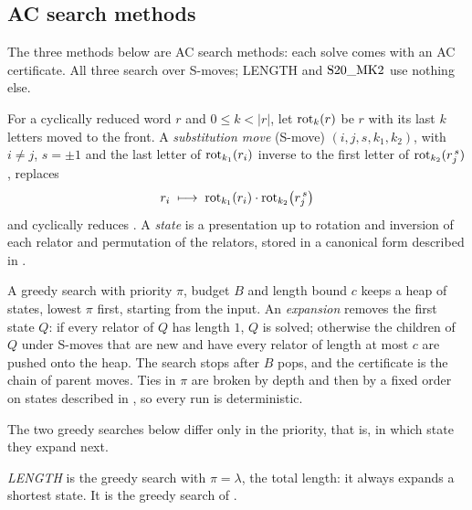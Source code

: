 \subsection{AC search methods}\label{sec:methods}

The three methods below are AC search methods: each solve comes with an AC certificate. All three search over
S-moves; LENGTH and $\mathrm{S20\_MK2}$ use nothing else.

\begin{definition}\label{def:smove}
For a cyclically reduced word $r$ and $0\le k<|r|$, let $\operatorname{rot}_k(r)$ be $r$ with its last $k$ letters moved to the
front. A \emph{substitution move} (S-move) $(i,j,s,k_1,k_2)$, with $i\neq j$, $s=\pm1$ and the last letter of $\operatorname{rot}_{k_1}(r_i)$ inverse to the first letter of
$\operatorname{rot}_{k_2}(r_j^{\,s})$, replaces
\[
r_i\;\longmapsto\;\operatorname{rot}_{k_1}(r_i)\cdot\operatorname{rot}_{k_2}\!\big(r_j^{\,s}\big)
\]
and cyclically reduces \cite{FTS26}. A \emph{state} is a presentation up to rotation and inversion of each relator and permutation of the relators,
stored in a canonical form described in \cite{FTS26}.
\end{definition}

\begin{definition}\label{def:greedy}
A greedy search with priority $\pi$, budget $B$ and length bound $c$ keeps a heap of states, lowest $\pi$ first,
starting from the input. An \emph{expansion} removes the first state $Q$: if every relator of $Q$ has length $1$, $Q$
is solved; otherwise the children of $Q$ under S-moves that are new and have every relator of length at most $c$ are pushed onto the heap. The search stops after $B$ pops, and the certificate is the chain of parent moves. Ties in $\pi$ are broken by depth and then by a fixed order on states described in \cite{FTS26}, so every run is deterministic.
\end{definition}

The two greedy searches below differ only in the priority, that is, in which state they expand next.

\begin{definition}[LENGTH]\label{def:length}
\emph{LENGTH} is the greedy search with $\pi=\lambda$, the total length: it always expands a shortest state. It is the
greedy search of \cite{SMM24}.
\end{definition}


